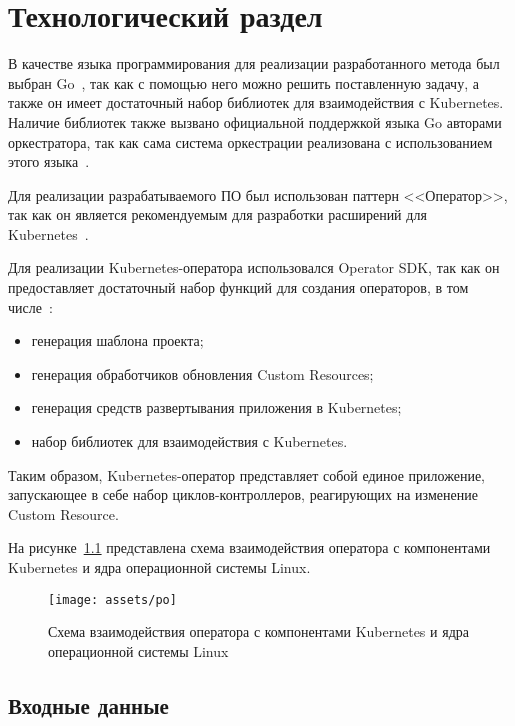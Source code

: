 \chapter{Технологический раздел}

В качестве языка программирования для реализации разработанного метода был выбран Go~\cite{donovan2015go}, так как с помощью него можно решить поставленную задачу, а также он имеет достаточный набор библиотек для взаимодействия с Kubernetes. Наличие библиотек также вызвано официальной поддержкой языка Go авторами оркестратора, так как сама система оркестрации реализована с использованием этого языка~\cite{kubernetes}.

Для реализации разрабатываемого ПО был использован паттерн <<Оператор>>, так как он является рекомендуемым для разработки расширений для Kubernetes~\cite{operator}.

Для реализации Kubernetes-оператора использовался Operator SDK, так как он предоставляет достаточный набор функций для создания операторов, в том числе~\cite{operator_sdk}:

\begin{itemize}
	\item генерация шаблона проекта;
	\item генерация обработчиков обновления Custom Resources;
	\item генерация средств развертывания приложения в Kubernetes;
	\item набор библиотек для взаимодействия с Kubernetes.
\end{itemize}

Таким образом, Kubernetes-оператор представляет собой единое приложение, запускающее в себе набор циклов-контроллеров, реагирующих на изменение Custom Resource.

\newpage

На рисунке~\ref{img:po} представлена схема взаимодействия оператора с компонентами Kubernetes и ядра операционной системы Linux.

\begin{figure}[h!]
    \centering
    \texttt{[image: assets/po]}
    \caption{Схема взаимодействия оператора с компонентами Kubernetes и ядра операционной системы Linux}
    \label{img:po}
\end{figure}

\section{Входные данные}


